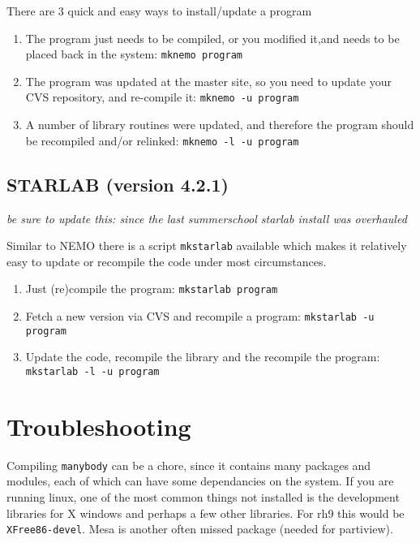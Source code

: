 There are 3 quick and easy ways to install/update a program

\begin{enumerate}

\item
The program just needs to be compiled, or you modified it,and needs to be
placed back in the system:
{\tt mknemo program}

\item
The program was updated at the master site, so you need to update your CVS
repository, and re-compile it:
{\tt mknemo -u program}

\item
A number of library routines were updated, and therefore the program
should be recompiled and/or relinked:
{\tt mknemo -l -u program}

\end{enumerate}

\section{STARLAB (version 4.2.1)}

{\it be sure to update this: since the last summerschool starlab install
was overhauled}

Similar to NEMO there is a script {\tt mkstarlab} available which
makes it relatively easy to update or recompile the code under
most circumstances.

\begin{enumerate}

\item
Just (re)compile the program:
{\tt mkstarlab program}

\item
Fetch a new version via CVS and recompile a program:
{\tt mkstarlab -u program}

\item
Update the code, recompile the library and the recompile the program:
{\tt mkstarlab -l -u program}

\end{enumerate}


\chapter                {Troubleshooting}

Compiling {\tt manybody} can be a chore, since it contains many packages
and modules, each of which can have some dependancies on the system.
If you are running linux, one of the most common things not installed
is the development libraries for X windows and perhaps a few other libraries.
For rh9 this would be {\tt  XFree86-devel}. Mesa is another often missed
package (needed for partiview).

